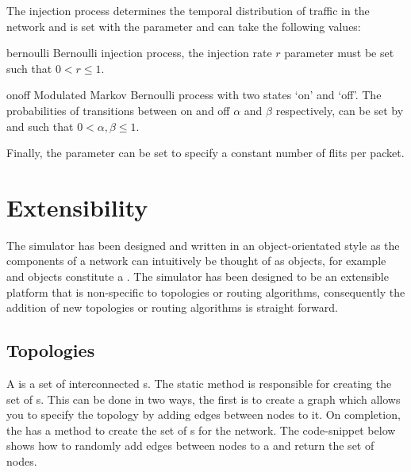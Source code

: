 \documentclass[10pt,a4paper]{article}
\begin{document}
The injection process determines the temporal distribution of traffic in the
network and is set with the  parameter and can take the
following values:

\begin{paramlist}

\item[bernoulli] Bernoulli injection process, the injection rate $r$ parameter
 must be set such that $0< r \leq 1$.

\item[onoff] Modulated Markov Bernoulli process with two states `on' and `off'.
The probabilities of transitions between on and off $\alpha$ and $\beta$
respectively, can be set by  and  such that $0
< \alpha, \beta \leq 1$.

\end{paramlist}

\noindent
Finally, the  parameter can be set to specify a
constant number of flits per packet.

\section{Extensibility}

The simulator has been designed and written in an object-orientated style as the
components of a network can intuitively be thought of as objects, for example
 and  objects constitute a . The simulator has
been designed to be an extensible platform that is non-specific to topologies or
routing algorithms, consequently the addition of new topologies or routing
algorithms is straight forward.

\subsection{Topologies}

A  is a set of interconnected s. The static method
 is responsible for creating the set of
s. This can be done in two ways, the first is to create a
 graph which allows you to specify the topology by adding
edges between nodes to it. On completion, the  has a method
 to create the set of s for the network.  The
code-snippet below shows how to randomly add edges between nodes to a
 and return the set of nodes.
\end{document}
